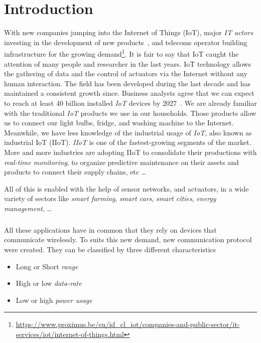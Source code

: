 \chapter{Introduction}

With new companies jumping into the Internet of Things (IoT), 
major \emph{IT actors} investing in the development of new
products~\cite{fortuneiot2019}, and telecoms operator building infrastructure 
for the growing demand\footnote{\url{https://www.proximus.be/en/id_cl_iot/companies-and-public-sector/it-services/iot/internet-of-things.html}}.
It is fair to say that IoT caught the attention of many people and researcher
in the last years.
IoT technology allows the gathering of data and the control of actuators via
the Internet without any human interaction.
The field has been developed during the last decade and has maintained a
consistent growth since.
Business analysts agree that we can expect to reach at least 40 billion
installed \emph{IoT} devices by 2027~\cite{businessinsider2020}.
We are already familiar with the traditional \emph{IoT} products
we use in our households. Those products allow us to connect our light bulbs,
fridge, and washing machine to the Internet.
Meanwhile, we have less knowledge of the industrial usage of \emph{IoT}, also
known as industrial IoT (IIoT). \emph{IIoT} is one of the fastest-growing
segments of the market.
More and more industries are adopting IIoT to consolidate their productions
with \emph{real-time monitoring}, to organize predictive maintenance on their
assets and products to connect their supply chains, etc \ldots

All of this is enabled with the help of sensor networks, and actuators, in a
wide variety of sectors like \emph{smart farming}, \emph{smart cars},
\emph{smart cities}, \emph{energy management}, \ldots

\paragraph{}

All these applications have in common that they rely on devices that
communicate wirelessly.
To suits this new demand, new communication protocol were created.
They can be classified by three different characteristics

\begin{itemize}
    \item Long or Short \emph{range}
    \item High or low \emph{data-rate}
    \item Low or high \emph{power usage} 
\end{itemize}

